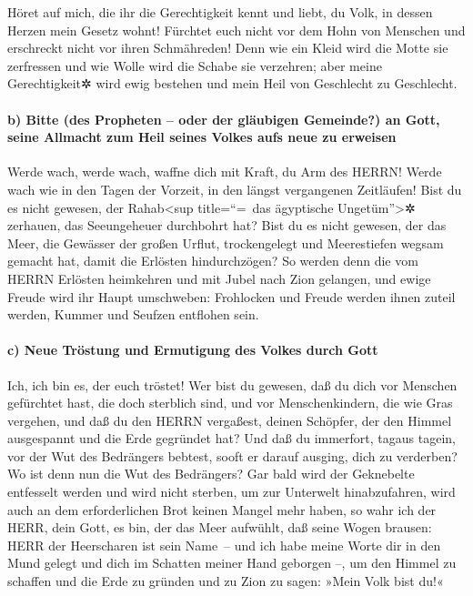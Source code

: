 Höret auf mich, die ihr die Gerechtigkeit kennt und liebt,
du Volk, in dessen Herzen mein Gesetz wohnt! Fürchtet euch nicht vor dem
Hohn von Menschen und erschreckt nicht vor ihren Schmähreden!
Denn wie ein Kleid wird die Motte sie zerfressen und wie
Wolle wird die Schabe sie verzehren; aber meine Gerechtigkeit✲ wird ewig
bestehen und mein Heil von Geschlecht zu Geschlecht.

\hypertarget{b-bitte-des-propheten-oder-der-gluxe4ubigen-gemeinde-an-gott-seine-allmacht-zum-heil-seines-volkes-aufs-neue-zu-erweisen}{%
\paragraph{b) Bitte (des Propheten -- oder der gläubigen Gemeinde?) an
Gott, seine Allmacht zum Heil seines Volkes aufs neue zu
erweisen}\label{b-bitte-des-propheten-oder-der-gluxe4ubigen-gemeinde-an-gott-seine-allmacht-zum-heil-seines-volkes-aufs-neue-zu-erweisen}}

Werde wach, werde wach, waffne dich mit Kraft, du Arm des
HERRN! Werde wach wie in den Tagen der Vorzeit, in den längst
vergangenen Zeitläufen! Bist du es nicht gewesen, der Rahab\textless sup
title=``=~das ägyptische Ungetüm''\textgreater✲ zerhauen, das
Seeungeheuer durchbohrt hat? Bist du es nicht gewesen,
der das Meer, die Gewässer der großen Urflut, trockengelegt und
Meerestiefen wegsam gemacht hat, damit die Erlösten hindurchzögen?
So werden denn die vom HERRN Erlösten heimkehren und mit
Jubel nach Zion gelangen, und ewige Freude wird ihr Haupt umschweben:
Frohlocken und Freude werden ihnen zuteil werden, Kummer und Seufzen
entflohen sein.

\hypertarget{c-neue-truxf6stung-und-ermutigung-des-volkes-durch-gott}{%
\paragraph{c) Neue Tröstung und Ermutigung des Volkes durch
Gott}\label{c-neue-truxf6stung-und-ermutigung-des-volkes-durch-gott}}

Ich, ich bin es, der euch tröstet! Wer bist du gewesen,
daß du dich vor Menschen gefürchtet hast, die doch sterblich sind, und
vor Menschenkindern, die wie Gras vergehen, und daß du
den HERRN vergaßest, deinen Schöpfer, der den Himmel ausgespannt und die
Erde gegründet hat? Und daß du immerfort, tagaus tagein, vor der Wut des
Bedrängers bebtest, sooft er darauf ausging, dich zu verderben? Wo ist
denn nun die Wut des Bedrängers? Gar bald wird der
Geknebelte entfesselt werden und wird nicht sterben, um zur Unterwelt
hinabzufahren, wird auch an dem erforderlichen Brot keinen Mangel mehr
haben, so wahr ich der HERR, dein Gott, es bin, der das
Meer aufwühlt, daß seine Wogen brausen: HERR der Heerscharen ist sein
Name~-- und ich habe meine Worte dir in den Mund gelegt
und dich im Schatten meiner Hand geborgen --, um den Himmel zu schaffen
und die Erde zu gründen und zu Zion zu sagen: »Mein Volk bist du!«

